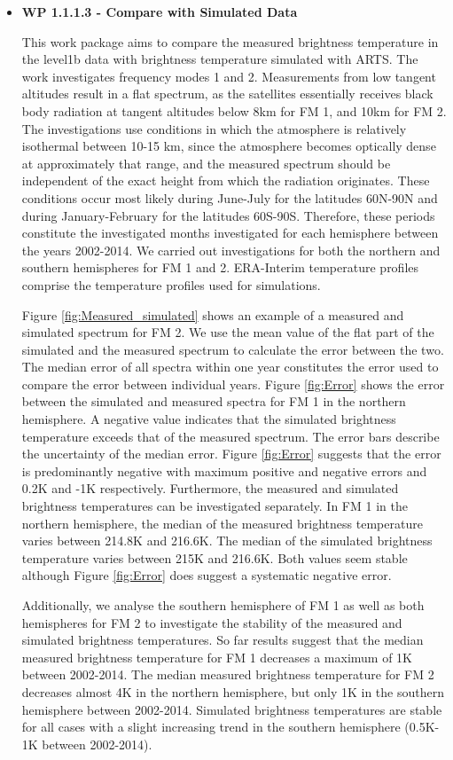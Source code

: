 \begin{itemize}

\item{\bf WP 1.1.1.3 - Compare with Simulated Data}

This work package aims to compare the measured brightness temperature in the level1b data with brightness temperature simulated with ARTS. The work investigates frequency modes 1 and 2. Measurements from low tangent altitudes result in a flat spectrum, as the satellites essentially receives black body radiation at tangent altitudes below 8km for FM 1, and 10km for FM 2. The investigations use conditions in which the atmosphere is relatively isothermal between 10-15 km, since the atmosphere becomes optically dense at approximately that range, and the measured spectrum should be independent of the exact height from which the radiation originates. These conditions occur most likely during June-July for the latitudes 60N-90N and during January-February for the latitudes 60S-90S. Therefore, these periods constitute the investigated months investigated for each hemisphere between the years 2002-2014. We carried out investigations for both the northern and southern hemispheres for FM 1 and 2. ERA-Interim temperature profiles comprise the temperature profiles used for simulations.

Figure \ref{fig:Measured_simulated} shows an example of a measured and simulated spectrum for FM 2. We use the mean value of the flat part of the simulated and the measured spectrum to calculate the error between the two. The median error of all spectra within one year constitutes the error used to compare the error between individual years. Figure \ref{fig:Error} shows the error between the simulated and measured spectra for FM 1 in the northern hemisphere. A negative value indicates that the simulated brightness temperature exceeds that of the measured spectrum. The error bars describe the uncertainty of the median error. Figure \ref{fig:Error} suggests that the error  is predominantly negative with maximum positive and negative errors and 0.2K and -1K respectively. Furthermore, the measured and simulated brightness temperatures can be investigated separately. In FM 1 in the northern hemisphere, the median of the measured brightness temperature varies between 214.8K and 216.6K. The median of the simulated brightness temperature varies between 215K and 216.6K. Both values seem stable although Figure \ref{fig:Error} does suggest a systematic negative error.

Additionally, we analyse the southern hemisphere of FM 1 as well as both hemispheres for FM 2 to investigate the stability of the measured and simulated brightness temperatures. So far results suggest that the median measured brightness temperature for FM 1 decreases a maximum of 1K between 2002-2014. The median measured brightness temperature for FM 2 decreases almost 4K in the northern hemisphere, but only 1K in the southern hemisphere between 2002-2014. Simulated brightness temperatures are stable for all cases with a slight increasing trend in the southern hemisphere (0.5K-1K between 2002-2014).


\end{itemize}
